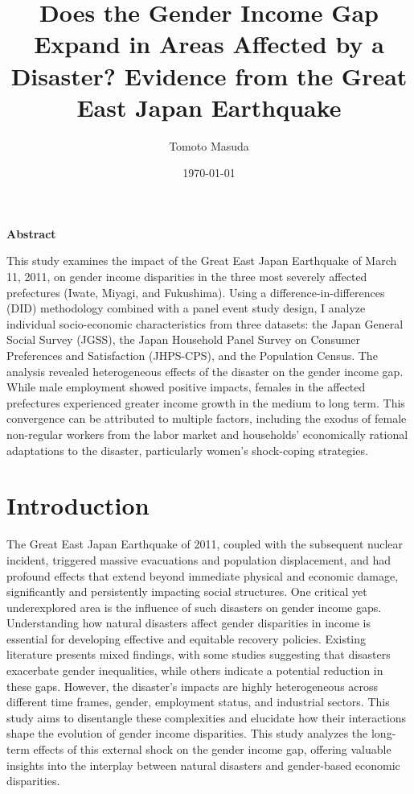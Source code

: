 \documentclass[a4paper,12pt]{article}
\begin{document}
\title{Does the Gender Income Gap Expand in Areas Affected by a Disaster? Evidence from the Great East Japan Earthquake}

\author{Tomoto Masuda}


\date{\today}

\maketitle

\begin{center}
    \textbf{Abstract}
\end{center}

\noindent

This study examines the impact of the Great East Japan Earthquake of March 11, 2011, on gender income disparities in the three most severely affected prefectures (Iwate, Miyagi, and Fukushima). Using a difference-in-differences (DID) methodology combined with a panel event study design, I analyze individual socio-economic characteristics from three datasets: the Japan General Social Survey (JGSS), the Japan Household Panel Survey on Consumer Preferences and Satisfaction (JHPS-CPS), and the Population Census. The analysis revealed heterogeneous effects of the disaster on the gender income gap. While male employment showed positive impacts, females in the affected prefectures experienced greater income growth in the medium to long term. This convergence can be attributed to multiple factors, including the exodus of female non-regular workers from the labor market and households' economically rational adaptations to the disaster, particularly women's shock-coping strategies.

\newpage

\tableofcontents


\clearpage
\section{Introduction}
\label{sec1}


The Great East Japan Earthquake of 2011, coupled with the subsequent nuclear incident, triggered massive evacuations and population displacement, and had profound effects that extend beyond immediate physical and economic damage, significantly and persistently impacting social structures. One critical yet underexplored area is the influence of such disasters on gender income gaps. Understanding how natural disasters affect gender disparities in income is essential for developing effective and equitable recovery policies. Existing literature presents mixed findings, with some studies suggesting that disasters exacerbate gender inequalities, while others indicate a potential reduction in these gaps. However, the disaster's impacts are highly heterogeneous across different time frames, gender, employment status, and industrial sectors. This study aims to disentangle these complexities and elucidate how their interactions shape the evolution of gender income disparities. This study analyzes the long-term effects of this external shock on the gender income gap, offering valuable insights into the interplay between natural disasters and gender-based economic disparities.
\end{document}
